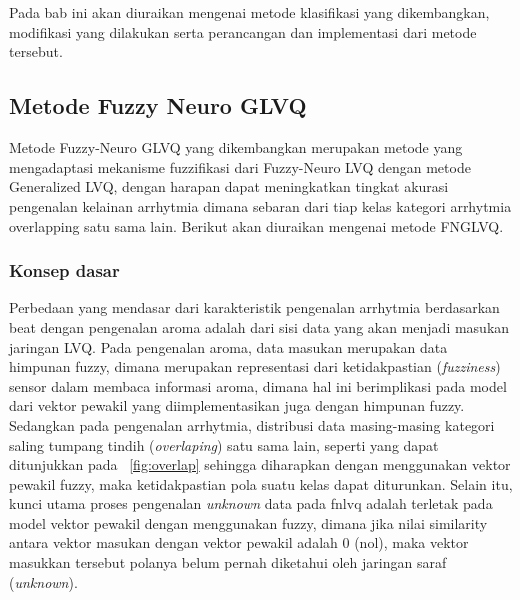 \chapter{\babEmpat}
Pada bab ini akan diuraikan mengenai  metode klasifikasi yang dikembangkan,
modifikasi yang dilakukan serta perancangan dan implementasi dari metode
tersebut.

\section{Metode Fuzzy Neuro GLVQ}
Metode Fuzzy-Neuro GLVQ yang dikembangkan merupakan metode yang
mengadaptasi mekanisme fuzzifikasi dari Fuzzy-Neuro LVQ dengan metode
Generalized LVQ, dengan harapan dapat meningkatkan tingkat akurasi pengenalan
kelainan arrhytmia dimana sebaran dari tiap kelas kategori arrhytmia overlapping
satu sama lain. Berikut akan diuraikan mengenai metode FNGLVQ.


\subsection{Konsep dasar}
Perbedaan yang mendasar dari karakteristik pengenalan arrhytmia berdasarkan beat
dengan pengenalan aroma adalah dari sisi data yang akan menjadi masukan
jaringan LVQ. Pada pengenalan aroma, data masukan merupakan data himpunan
fuzzy, dimana merupakan representasi dari ketidakpastian (\emph{fuzziness})
sensor dalam membaca informasi aroma, dimana hal ini berimplikasi pada model
dari vektor pewakil yang diimplementasikan juga dengan himpunan fuzzy. Sedangkan
pada pengenalan arrhytmia, distribusi data masing-masing kategori saling tumpang
tindih (\emph{overlaping}) satu sama lain, seperti yang dapat ditunjukkan pada
\pic~\ref{fig:overlap} sehingga diharapkan dengan menggunakan vektor pewakil
fuzzy, maka ketidakpastian pola suatu kelas dapat diturunkan. Selain itu, kunci
utama proses pengenalan \emph{unknown} data pada \gls{fnlvq} adalah terletak
pada model vektor pewakil dengan menggunakan fuzzy, dimana jika nilai
similarity antara vektor masukan dengan vektor pewakil adalah 0 (nol), maka
vektor masukkan tersebut polanya belum pernah diketahui oleh jaringan saraf
(\emph{unknown}).
 
